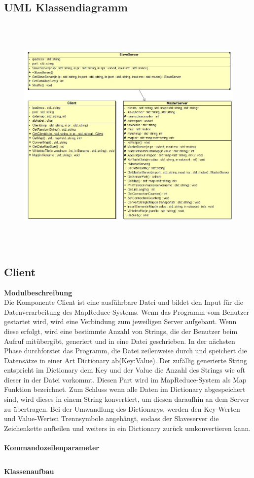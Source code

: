 \documentclass[a4paper,12pt]{article}
\begin{document}
\subsection{UML Klassendiagramm}
\:
\:
\begin{figure}[h]
    \centering
    \includegraphics[width=12cm, height=12cm]{uml.jpeg}
\end{figure}
\newpage
\subsection{Client}
\textbf{Modulbeschreibung}\\
Die Komponente Client ist eine ausführbare Datei und bildet den Input für die Datenverarbeitung des MapReduce-Systems. Wenn das Programm vom Benutzer gestartet wird, wird eine Verbindung zum jeweiligen Server aufgebaut. Wenn diese erfolgt, wird eine bestimmte Anzahl von Strings, 
die der Benutzer beim Aufruf mitübergibt, generiert und in eine Datei geschrieben. In der nächsten Phase durchforstet das Programm, die Datei zeilenweise durch und speichert die Datensätze in einer Art Dictionary ab(Key:Value). Der zufällig generierte String entspricht im Dictionary dem Key und der Value die Anzahl des Strings wie oft dieser in der Datei vorkommt.
Diesen Part wird im MapReduce-System als Map Funktion bezeichnet. Zum Schluss wenn alle Daten im Dictionary abgespeichert sind, wird dieses in einem
String konvertiert, um diesen daraufhin an dem Server zu übertragen. Bei der Umwandlung des Dictionarys, werden den Key-Werten und Value-Werten Trennsymbole angehängt, sodass der Slaveserver die Zeichenkette aufteilen und weiters in ein Dictionary zurück umkonvertieren kann.\\\\
\textbf{Kommandozeilenparameter}\\
\begin{verbatim}

\end{verbatim}
\newpage
\textbf{Klassenaufbau}\\
\end{document}
